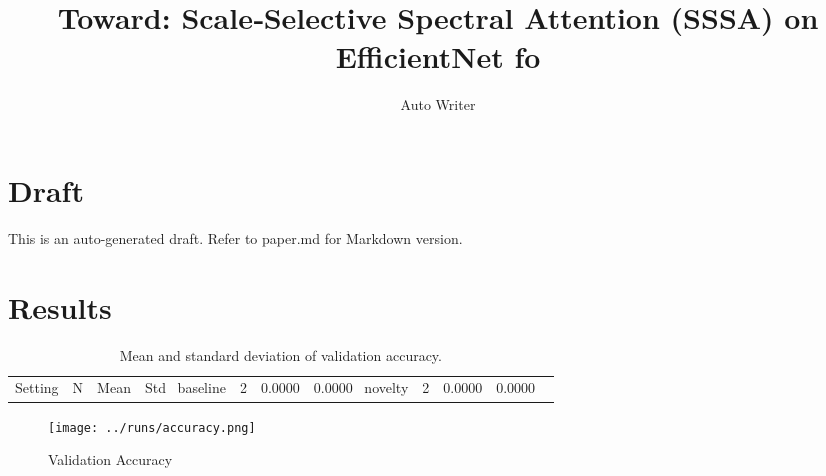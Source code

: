 \documentclass[11pt]{article}
\title{Toward: Scale‑Selective Spectral Attention (SSSA) on EfficientNet fo}
\author{Auto Writer}
\date{}
\begin{document}
\maketitle
\section*{Draft}
This is an auto-generated draft. Refer to paper.md for Markdown version.
\section*{Results}
\begin{table}[h!]\centering\begin{tabular}{lrrr}\hline Setting & N & Mean & Std \ \hline baseline & 2 & 0.0000 & 0.0000 \  novelty & 2 & 0.0000 & 0.0000 \  \hline\end{tabular}\caption{Mean and standard deviation of validation accuracy.}\end{table}
\begin{figure}[h!]\centering\texttt{[image: ../runs/accuracy.png]}\caption{Validation Accuracy}\end{figure}


\end{document}
